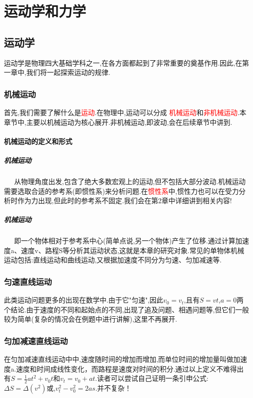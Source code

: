  \chapter{运动学和力学}
 \section{运动学}
 运动学是物理四大基础学科之一,在各方面都起到了非常重要的奠基作用.因此,在第一章中,我们将一起探索运动的规律.
 \subsection{机械运动}
 首先,我们需要了解什么是\textcolor{red}{运动}.在物理中,运动可以分成\textcolor{red}{ 机械运动}和\textcolor{red}{非机械运动}.本章节中,主要以机械运动为核心展开.非机械运动,即波动,会在后续章节中讲到.
 \subsubsection{机械运动的定义和形式} 
 \paragraph{机械运动} \ \ \ 从物理角度出发,包含了绝大多数宏观上的运动,但不包括大部分波动.机械运动需要选取合适的参考系(即惯性系)来分析问题.在\textcolor{red}{惯性系}中,惯性力也可以在受力分析时作为力出现,但此时的参考系不固定.我们会在第2章中详细讲到相关内容!
 \paragraph{机械运动}\ \ \ 即一个物体相对于参考系中心(简单点说,另一个物体)产生了位移.通过计算加速度a、速度v、路程S等分析其运动状态,这就是本章的研究对象.常见的单物体机械运动包括:直线运动和曲线运动,又根据加速度不同分为匀速、匀加减速等.
 \subsection{匀速直线运动}
 此类运动问题更多的出现在数学中.由于它"匀速",因此$v_0=v_t$,且有$S=vt$,$a=0$两个结论.由于速度的不同和起始点的不同,出现了追及问题、相遇问题等,但它们一般较为简单(复杂的情况会在例题中进行讲解),这里不再展开.
 \subsection{匀加减速直线运动}
 在匀加减速直线运动中中,速度随时间的增加而增加,而单位时间的增加量叫做加速度a.速度和时间成线性变化，而路程是速度对时间的积分.通过以上定义不难得出有$S=\frac{1}{2}at^2+v_0t$和$v_t=v_0+at$.读者可以尝试自己证明一条引申公式:$\Delta S=\Delta(v^2)$或,$v^2_t-v^2_0=2as$.并不复杂！
